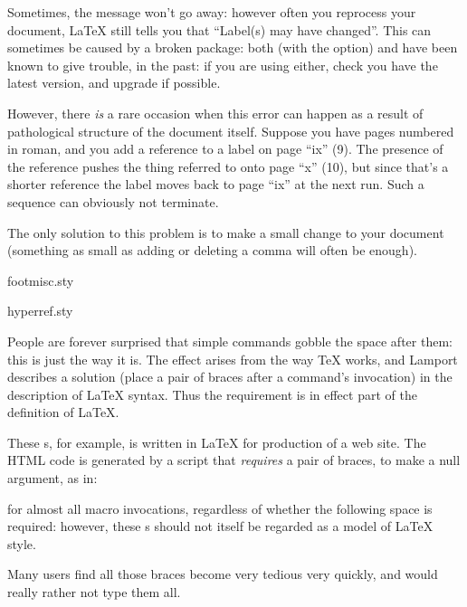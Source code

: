 Sometimes, the message won't go away: however often you reprocess your
document, \LaTeX{} still tells you that ``Label(s) may have
changed''.  This can sometimes be caused by a broken package: both
 (with the  option) and 
have been known to give trouble, in the past: if you are using either,
check you have the latest version, and upgrade if possible.

However, there \emph{is} a rare occasion when this error can happen
as a result of pathological structure of the document itself.  Suppose
you have pages numbered in roman, and you add a reference to a label
on page ``ix'' (9).  The presence of the reference pushes the thing
referred to onto page ``x'' (10), but since that's a shorter reference
the label moves back to page ``ix'' at the next run.  Such a sequence
can obviously not terminate.

The only solution to this problem is to make a small change to your
document (something as small as adding or deleting a comma will often
be enough).
\begin{ctanrefs}
\item[footmisc.sty]
\item[hyperref.sty]
\end{ctanrefs}


People are forever surprised that simple commands gobble the space
after them: this is just the way it is.  The effect arises from the
way \TeX{} works, and Lamport describes a solution (place a pair of braces
after a command's invocation) in the description of \LaTeX{} syntax.
Thus the requirement is in effect part of the definition of \LaTeX{}.

These s,
for example, is written in \LaTeX{} for production of a web site.  The
HTML code is generated by a script that \emph{requires} a pair of
braces, to make a null argument, as in:
\begin{quote}
\end{quote}
for almost all macro invocations, regardless
of whether the following space is required: however, these s
should not itself be regarded as a model of \LaTeX{} style.

Many users find all those braces become very tedious very
quickly, and would really rather not type them all.

